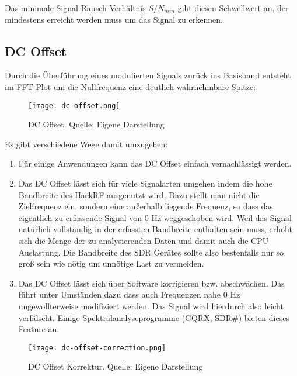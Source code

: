 Das minimale Signal-Rausch-Verhältnis \(S/N_{min}\) gibt diesen Schwellwert an, der mindestens erreicht werden muss um das Signal zu erkennen. 

\subsection{DC Offset}
Durch die Überführung eines modulierten Signals zurück ins Basisband entsteht im FFT-Plot um die Nullfrequenz eine deutlich wahrnehmbare Spitze:
\begin{figure}[ht]
	\centering
	\texttt{[image: dc-offset.png]}
	\caption[DC Offset]{DC Offset. Quelle: Eigene Darstellung} 
	\label{dc-offset}
\end{figure}

Es gibt verschiedene Wege damit umzugehen:
\begin{enumerate}
	\item Für einige Anwendungen kann das DC Offset einfach vernachlässigt werden.
	\item Das DC Offset lässt sich für viele Signalarten umgehen indem die hohe Bandbreite des HackRF ausgenutzt wird. 
	Dazu stellt man nicht die Zielfrequenz ein, sondern eine außerhalb liegende Frequenz, so dass das eigentlich zu erfassende Signal von 0 Hz  weggeschoben wird. Weil das Signal natürlich vollständig in der erfassten Bandbreite enthalten sein muss, erhöht sich die Menge der zu analysierenden Daten und damit auch die CPU Auslastung. Die Bandbreite des SDR Gerätes sollte also bestenfalls nur so groß sein wie nötig um unnötige Last zu vermeiden.
	\item Das DC Offset lässt sich über Software korrigieren bzw. abschwächen. Das führt unter Umständen dazu dass auch Frequenzen nahe 0 Hz ungewollterweise modifiziert werden. Das Signal wird hierdurch also leicht verfälscht. Einige Spektralanalyseprogramme (GQRX, SDR\#) bieten dieses Feature an.
\end{enumerate}

\begin{figure}[ht]
	\centering
	\texttt{[image: dc-offset-correction.png]}
	\caption[DC Offset Korrektur]{DC Offset Korrektur. Quelle: Eigene Darstellung} 
	\label{dc-offset-correction}
\end{figure}



